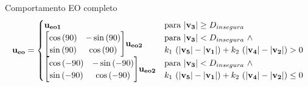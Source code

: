 \begin{frame}
	\begin{exampleblock}{Comportamento EO completo}
		\begin{equation}
			\mathbf{u_{eo}} = 
			\begin{cases}
				\mathbf{u_{eo1}} & \text{para} \ | \mathbf{v_3} | \geq D_{insegura} \\
				
				\mleft[
				\begin{matrix}
		  			\cos{(90)} & -\sin{(90)} \\
		  			\sin{(90)} & \cos{(90)} \\
				\end{matrix}
				\mright] \mathbf{u_{eo2}} & 				
				\begin{matrix*}[l]
		  			\text{para} \ | \mathbf{v_3} | < D_{insegura} \ \land \\
		  			k_1 \ (|\mathbf{v_5}| - |\mathbf{v_1}|) + k_2 \ (|\mathbf{v_4}| - |\mathbf{v_2}|)
					> 0 \\
				\end{matrix*} \\
				
				\mleft[
				\begin{matrix}
		  			\cos{(-90)} & -\sin{(-90)} \\
		  			\sin{(-90)} & \cos{(-90)} \\
				\end{matrix}
				\mright] \mathbf{u_{eo2}} & 
				\begin{matrix*}[l]
		  			\text{para} \ | \mathbf{v_3} | < D_{insegura} \ \land \\
		  			k_1 \ (|\mathbf{v_5}| - |\mathbf{v_1}|) + k_2 \ (|\mathbf{v_4}| - |\mathbf{v_2}|)
					\leq 0 \\
				\end{matrix*} \\
			\end{cases}
		\end{equation}
	\end{exampleblock}
\end{frame}

